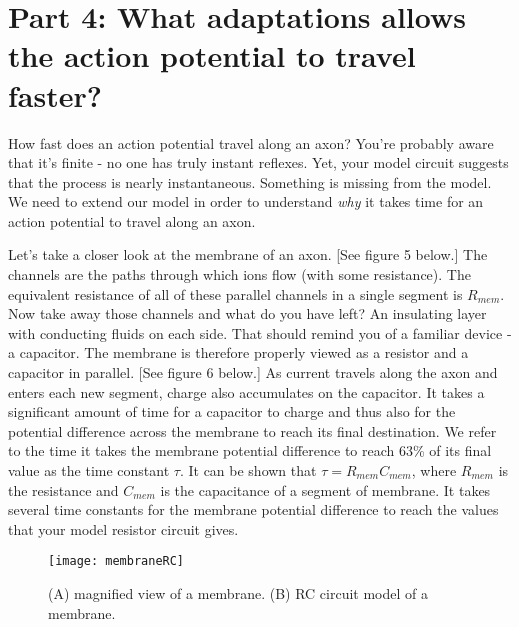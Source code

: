 \section*{Part 4: What adaptations allows the action potential to travel faster?}
How fast does an action potential travel along an axon?
You're probably aware that it's finite - no one has truly instant reflexes.
Yet, your model circuit suggests that the process is nearly instantaneous.
Something is missing from the model.
We need to extend our model in order to understand \emph{why} it takes time for an action potential to travel along an axon.
\par 
Let's take a closer look at the membrane of an axon.
[See figure 5 below.]
The channels are the paths through which ions flow (with some resistance).
The equivalent resistance of all of these parallel channels in a single segment is $R_{mem}$.
Now take away those channels and what do you have left?
An insulating layer with conducting fluids on each side.
That should remind you of a familiar device - a capacitor.
The membrane is therefore properly viewed as a resistor and a capacitor in parallel.
[See figure 6 below.]
As current travels along the axon and enters each new segment, charge also accumulates on the capacitor.
It takes a significant amount of time for a capacitor to charge and thus also for the potential difference across the membrane to reach its final destination.
We refer to the time it takes the membrane potential difference to reach 63\% of its final value as the time constant $\tau$.
It can be shown that $\tau = R_{mem}C_{mem}$, where $R_{mem}$ is the resistance and $C_{mem}$ is the capacitance of a segment of membrane.
It takes several time constants for the membrane potential difference to reach the values that your model resistor circuit gives.
\begin{figure}[hbtp]
\centering
\texttt{[image: membraneRC]}
\caption{(A) magnified view of a membrane. (B) RC circuit model of a membrane.}
\label{fig:memRC}
\end{figure}


